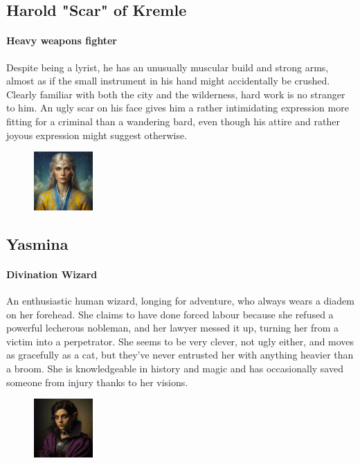 \documentclass[10pt,twocolumn,twoside,openany,bg=full,layout=true,nomultitoc]{dndbook}
\begin{document}
  \subsection {Harold "Scar" of Kremle}\label{subsec:harold-"scar"-of-kremle}

  \paragraph{Heavy weapons fighter}
  Despite being a lyrist, he has an unusually muscular build and strong arms, almost as if the small instrument in his
  hand might accidentally be crushed.
  Clearly familiar with both the city and the wilderness, hard work is no stranger to him.
  An ugly scar on his face gives him a rather intimidating expression more fitting for a criminal than a wandering bard,
  even though his attire and rather joyous expression might suggest otherwise.

  \begin{figure}
    \begin{center}
      \includegraphics[width=0.2\textwidth]{img/yasmina}
    \end{center}
  \end{figure}
  \subsection{Yasmina}\label{subsec:yasmina}

  \paragraph{Divination Wizard}
  An enthusiastic human wizard, longing for adventure, who always wears a diadem on her forehead.
  She claims to have done forced labour because she refused a powerful lecherous nobleman, and her lawyer messed it up,
  turning her from a victim into a perpetrator.
  She seems to be very clever, not ugly either, and moves as gracefully as a cat, but they've never entrusted her
  with anything heavier than a broom.
  She is knowledgeable in history and magic and has occasionally saved someone from injury thanks to her visions.


  \begin{figure}
    \begin{center}
      \includegraphics[width=0.2\textwidth]{img/silgrid}
    \end{center}
  \end{figure}
\end{document}

